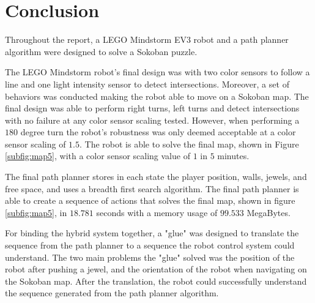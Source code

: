 \documentclass[../report.tex]{subfiles}
\begin{document}
\section{Conclusion} \label{sec:conclusion}
Throughout the report, a LEGO Mindstorm EV3 robot and a path planner algorithm were designed to solve a Sokoban puzzle.

The LEGO Mindstorm robot's final design was with two color sensors to follow a line and one light intensity sensor to detect intersections. Moreover, a set of behaviors was conducted making the robot able to move on a Sokoban map. The final design was able to perform right turns, left turns and detect intersections with no failure at any color sensor scaling tested. However, when performing a $180$ degree turn the robot's robustness was only deemed acceptable at a color sensor scaling of $1.5$. The robot is able to solve the final map, shown in Figure \ref{subfig:map5}, with a color sensor scaling value of $1$ in $5$ minutes.

The final path planner stores in each state the player position, walls, jewels, and free space, and uses a breadth first search algorithm. The final path planner is able to create a sequence of actions that solves the final map, shown in figure \ref{subfig:map5}, in $18.781$ seconds with a memory usage of $99.533$ MegaBytes.

For binding the hybrid system together, a "glue" was designed to translate the sequence from the path planner to a sequence the robot control system could understand. The two main problems the "glue" solved was the position of the robot after pushing a jewel, and the orientation of the robot when navigating on the Sokoban map. After the translation, the robot could successfully understand the sequence generated from the path planner algorithm. 
\end{document}
